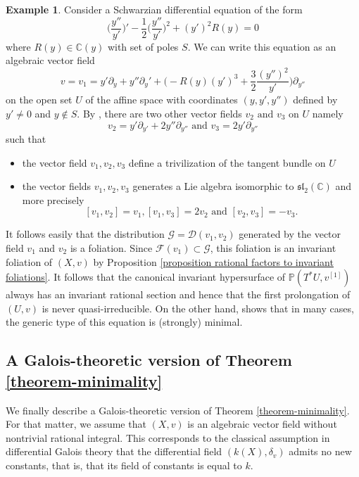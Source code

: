 \documentclass[12pt]{amsart}
\theoremstyle{definition}
\newtheorem{example}[definition]{Example}
\theoremstyle{plain}
\theoremstyle{exampstyle}
\theoremstyle{exampstyle}\newtheorem{thmxbis}{Theorem}
\numberwithin{equation}{section}
\theoremstyle{remark}
\begin{document}
\begin{example} \label{example-Schwarzian}
Consider a Schwarzian differential equation of the form 
$$ \Big(\frac{y''}{y'}\Big)' - \frac 1 2 \Big(\frac{y''}{y'}\Big)^2 + (y')^2 R(y) = 0$$  where $R(y) \in \mathbb{C}(y)$ with set of poles $S$. We can write this equation as an algebraic vector field 
$$v = v_1 =  y' \partial_y + y'' \partial_y' + \Big( - R(y) (y')^3 + \frac 3 2 \frac {(y'')^2}{y'} \Big)  \partial_{y''} $$
on the open set $U$ of the affine space with coordinates $(y,y',y'')$ defined by $y' \neq 0$ and $y \notin S$. By \cite{Blazquez-Casale}, there are two other vector fields $v_2 \text{ and } v_3$ on $U$ namely 
$$ v_2 = y' \partial_{y'} + 2y'' \partial_{y''} \text{ and } v_3 = 2y' \partial_{y''}$$ 
such that
\begin{itemize} 
\item the vector field $v_1,v_2,v_3$ define a trivilization of the tangent bundle on $U$ 
\item the vector fields $v_1,v_2,v_3$ generates a Lie algebra isomorphic to $\mathfrak{sl}_2(\mathbb{C})$ and more precisely
$$[v_1,v_2] = v_1, [v_1,v_3] =  2v_2 \text{ and } [v_2,v_3] = - v_3.$$ 

\end{itemize} 

It follows easily that the distribution $\mathcal G = \mathcal D(v_1,v_2)$ generated by the vector field $v_1$ and $v_2$ is a foliation. Since $\mathcal F(v_1) \subset \mathcal G$, this foliation is an invariant foliation of $(X,v)$ by Proposition \ref{proposition rational factors to invariant foliations}.  It follows that the canonical invariant hypersurface of  $\mathbb{P}(T^\ast U,v^{[1]})$ always has an invariant rational section and hence that the first prolongation of $(U,v)$ is never quasi-irreducible. On the other hand, \cite{Casale-Freitag-Nagloo} shows that in many cases, the generic type of this equation is (strongly) minimal. 
\end{example}

\subsection{A Galois-theoretic version of Theorem \ref{theorem-minimality}} We finally describe a Galois-theoretic version of Theorem \ref{theorem-minimality}. For that matter, we assume that $(X,v)$ is an algebraic vector field without nontrivial rational integral. This corresponds to the classical assumption in differential Galois theory that the differential field $(k(X),\delta_v)$ admits no new constants, that is, that its field of constants is equal to $k$.
\end{document}
